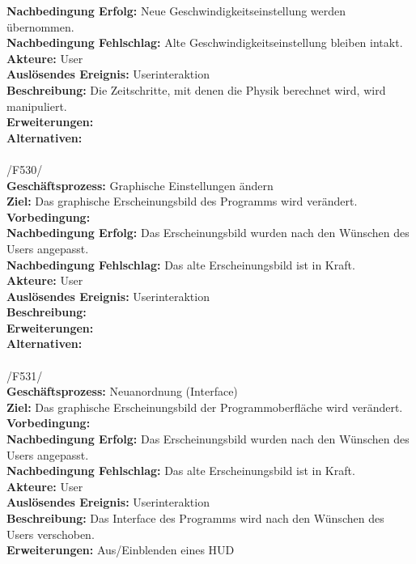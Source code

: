 \textbf{Nachbedingung Erfolg:} Neue Geschwindigkeitseinstellung werden übernommen.\\
\textbf{Nachbedingung Fehlschlag:} Alte Geschwindigkeitseinstellung bleiben intakt.\\
\textbf{Akteure:} User\\
\textbf{Auslösendes Ereignis:} Userinteraktion\\
\textbf{Beschreibung:} Die Zeitschritte, mit denen die Physik berechnet wird, wird manipuliert.\\
\textbf{Erweiterungen:}\\
\textbf{Alternativen:}\\
\\
/F530/\\
\textbf{Geschäftsprozess:} Graphische Einstellungen ändern\\
\textbf{Ziel:} Das graphische Erscheinungsbild des Programms wird verändert.\\
\textbf{Vorbedingung:} \\
\textbf{Nachbedingung Erfolg:} Das Erscheinungsbild wurden nach den Wünschen des Users angepasst.\\
\textbf{Nachbedingung Fehlschlag:} Das alte Erscheinungsbild ist in Kraft.\\
\textbf{Akteure:} User\\
\textbf{Auslösendes Ereignis:} Userinteraktion\\
\textbf{Beschreibung:} \\
\textbf{Erweiterungen:}\\
\textbf{Alternativen:}\\
\\
/F531/\\
\textbf{Geschäftsprozess:}  Neuanordnung (Interface)\\
\textbf{Ziel:} Das graphische Erscheinungsbild der Programmoberfläche wird verändert.\\
\textbf{Vorbedingung:} \\
\textbf{Nachbedingung Erfolg:} Das Erscheinungsbild wurden nach den Wünschen des Users angepasst.\\
\textbf{Nachbedingung Fehlschlag:} Das alte Erscheinungsbild ist in Kraft.\\
\textbf{Akteure:} User\\
\textbf{Auslösendes Ereignis:} Userinteraktion\\
\textbf{Beschreibung:} Das Interface des Programms wird nach den Wünschen des Users verschoben.\\
\textbf{Erweiterungen:} Aus/Einblenden eines HUD\\
